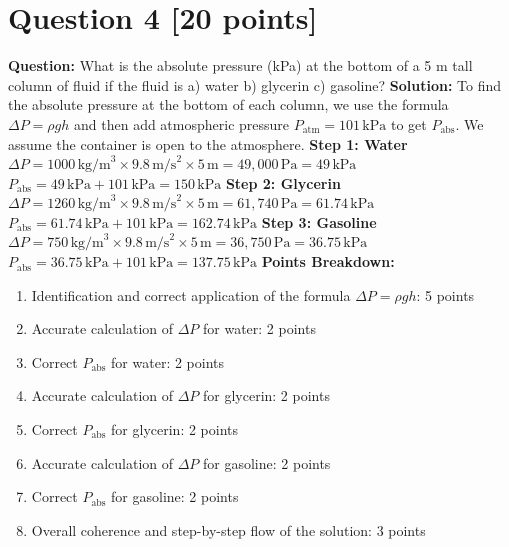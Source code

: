 \documentclass{article}
\begin{document}
\newpage
\section*{Question 4 [20 points]}
\textbf{Question:} What is the absolute pressure (kPa) at the bottom of a 5 m tall column of fluid if the fluid is a) water b) glycerin c) gasoline?
\newline \newline
\textbf{Solution:} 
\newline
To find the absolute pressure at the bottom of each column, we use the formula \( \Delta P = \rho g h \) and then add atmospheric pressure \( P_{\text{atm}} = 101 \, \text{kPa} \) to get \( P_{\text{abs}} \). 
\newline We assume the container is open to the atmosphere.
\newline \newline
\textbf{Step 1: Water}
\newline
\( \Delta P = 1000 \, \text{kg/m}^3 \times 9.8 \, \text{m/s}^2 \times 5 \, \text{m} = 49,000 \, \text{Pa} = 49 \, \text{kPa} \)
\newline
\( P_{\text{abs}} = 49 \, \text{kPa} + 101 \, \text{kPa} = 150 \, \text{kPa} \)
\newline \newline
\textbf{Step 2: Glycerin}
\newline
\( \Delta P = 1260 \, \text{kg/m}^3 \times 9.8 \, \text{m/s}^2 \times 5 \, \text{m} = 61,740 \, \text{Pa} = 61.74 \, \text{kPa} \)
\newline
\( P_{\text{abs}} = 61.74 \, \text{kPa} + 101 \, \text{kPa} = 162.74 \, \text{kPa} \)
\newline \newline
\textbf{Step 3: Gasoline}
\newline
\( \Delta P = 750 \, \text{kg/m}^3 \times 9.8 \, \text{m/s}^2 \times 5 \, \text{m} = 36,750 \, \text{Pa} = 36.75 \, \text{kPa} \)
\newline
\( P_{\text{abs}} = 36.75 \, \text{kPa} + 101 \, \text{kPa} = 137.75 \, \text{kPa} \)
\newline \newline
\textbf{Points Breakdown:}
\begin{enumerate}
    \renewcommand{\labelenumi}{\alph{enumi})}
    \item Identification and correct application of the formula \( \Delta P = \rho g h \): 5 points
    \item Accurate calculation of \( \Delta P \) for water: 2 points
    \item Correct \( P_{\text{abs}} \) for water: 2 points
    \item Accurate calculation of \( \Delta P \) for glycerin: 2 points
    \item Correct \( P_{\text{abs}} \) for glycerin: 2 points
    \item Accurate calculation of \( \Delta P \) for gasoline: 2 points
    \item Correct \( P_{\text{abs}} \) for gasoline: 2 points
    \item Overall coherence and step-by-step flow of the solution: 3 points
\end{enumerate}
\end{document}
